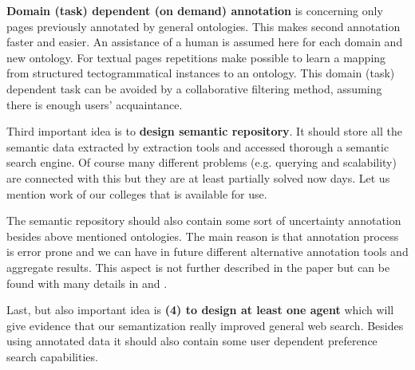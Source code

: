 \documentclass{www2009-submission}
\begin{document}

\textbf{Domain (task) dependent (on demand) annotation} is concerning only pages previously annotated by general ontologies. This makes second annotation faster and easier. An assistance of a human is assumed here for each domain and new ontology. For textual pages repetitions make possible to learn a mapping from structured tectogrammatical instances to an ontology. This domain (task) dependent task can be avoided by a collaborative filtering method, assuming there is enough users' acquaintance. \par

Third important idea is to \textbf{design semantic repository}. It should store all the semantic data extracted by extraction tools and accessed thorough a semantic search engine. Of course many different problems (e.g. querying and scalability) are connected with this but they are at least partially solved now days. Let us mention work of our colleges \cite{biblio:DoTySemanticWeb2007} that is available for use.

The semantic repository should also contain some sort of uncertainty annotation besides above mentioned ontologies. The main reason is that annotation process is error prone and we can have in future different alternative annotation tools and aggregate results. This aspect is not further described in the paper but can be found with many details in \cite{biblio:DeEcDiscussionUncertainty2008} and \cite{biblio:EcHoUncertaintyIssues2008}.\par

Last, but also important idea is \textbf{(4) to design at least one agent} which will give evidence that our semantization really improved general web search. Besides using annotated data it should also contain some user dependent preference search capabilities.
\end{document}
